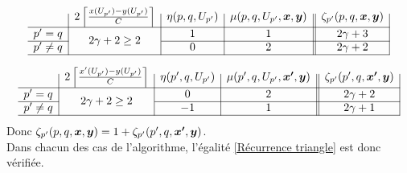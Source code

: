 \begin{gather*}
  \begin{array}{c|c|c|c||c|}
    & 2 \left\lceil \frac{x(U_{p'})-y(U_{p'})}{C} \right\rceil
    & \eta(p,q,U_{p'})
    & \mu(p,q,U_{p'},\bs{x},\bs{y})
    & \zeta_{p'}(p,q,\bs{x},\bs{y})
    \\ \hline
    p'=q
    & \multirow{2}{*}{$2 \gamma + 2 \ge 2$}
    & 1
    & 1
    & 2 \gamma + 3
    \\ \cline{1-1}\cline{3-5}
    p' \ne q
    &
    & 0
    & 2
    & 2\gamma + 2
    \\ \hline
  \end{array}
\end{gather*}

\begin{gather*}
  \begin{array}{c|c|c|c||c|}
    & 2 \left\lceil \frac{x'(U_{p'})-y(U_{p'})}{C} \right\rceil
    & \eta(p',q,U_{p'})
    & \mu(p',q,U_{p'},\bs{x'},\bs{y})
    & \zeta_{p'}(p',q,\bs{x'},\bs{y})
    \\ \hline
    p'=q
    & \multirow{2}{*}{$2 \gamma + 2 \ge 2$}
    & 0
    & 2
    & 2 \gamma + 2
    \\ \cline{1-1}\cline{3-5}
    p' \ne q
    &
    & -1
    & 1
    & 2\gamma + 1
    \\ \hline
  \end{array}
\end{gather*}
Donc $\zeta_{p'}(p,q,\boldsymbol{x},\boldsymbol{y}) = 1 + \zeta_{p'}(p',q,\boldsymbol{x'},\boldsymbol{y})$.
\\

Dans chacun des cas de l'algorithme, l'égalité \eqref{Récurrence triangle} est donc vérifiée.
